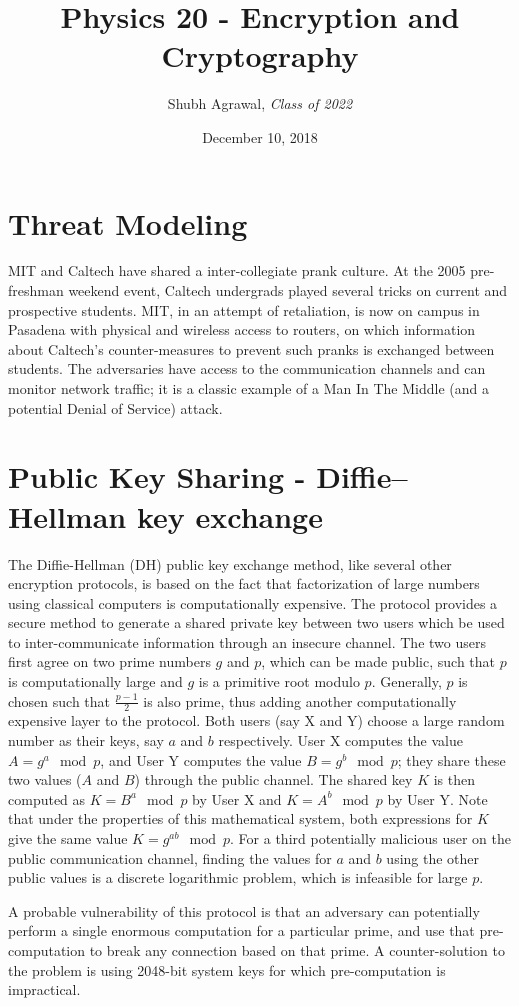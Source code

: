 \documentclass{report}
\title{\Large  Physics 20 - Encryption and Cryptography}
\author{\large Shubh Agrawal, \normalsize\emph{Class of 2022}}
\date{\small December 10, 2018}
\begin{document}
\maketitle
\section*{Threat Modeling}
MIT and Caltech have shared a inter-collegiate prank culture. At the 2005 pre-freshman weekend event, Caltech undergrads played several tricks on current and prospective students. MIT, in an attempt of retaliation, is now on campus in Pasadena with physical and wireless access to routers, on which information about Caltech's counter-measures to prevent such pranks is exchanged between students. The adversaries have access to the communication channels and can monitor network traffic; it is a classic example of a Man In The Middle (and a potential Denial of Service) attack.
\section*{Public Key Sharing - Diffie–Hellman key exchange}
The Diffie-Hellman (DH) public key exchange method, like several other encryption protocols, is based on the fact that factorization of large numbers using classical computers is computationally expensive. The protocol provides a secure method to generate a shared private key between two users which be used to inter-communicate information through an insecure channel. The two users first agree on two prime numbers $g$ and $p$, which can be made public, such that $p$ is computationally large and $g$ is a primitive root modulo $p$. Generally, $p$ is chosen such that $\frac{p-1}{2}$ is also prime, thus adding another computationally expensive layer to the protocol. Both users (say X and Y) choose a large random number as their keys, say $a$ and $b$ respectively. User X computes the value $A = g^a \mod p$, and User Y computes the value $B = g^b \mod p$; they share these two values ($A$ and $B$) through the public channel. The shared key $K$ is then computed as $K=B^a \mod p$ by User X and $K=A^b \mod p$ by User Y. Note that under the properties of this mathematical system, both expressions for $K$ give the same value $K=g^{ab}\mod p$. For a third potentially malicious user on the public communication channel, finding the values for $a$ and $b$ using the other public values is a discrete logarithmic problem, which is infeasible for large $p$. 

A probable vulnerability of this protocol is that an adversary can potentially perform a single enormous computation for a particular prime, and use that pre-computation to break any connection based on that prime. A counter-solution to the problem is using 2048-bit system keys for which pre-computation is impractical.
\end{document}
